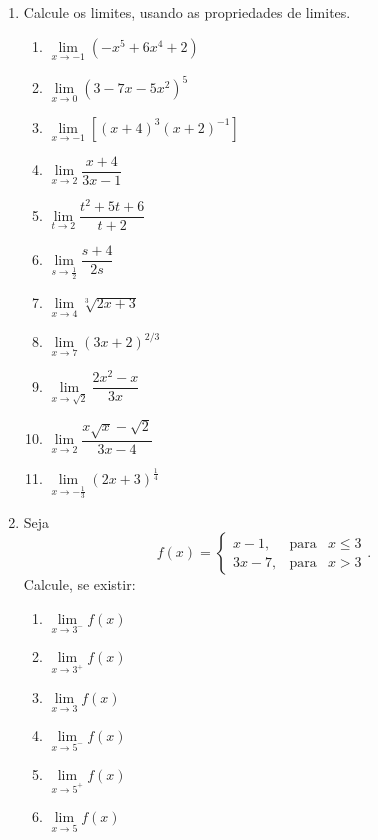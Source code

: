 

\begin{enumerate}

\item Calcule os limites, usando as propriedades de limites.
\begin{multicols}{3}
\begin{enumerate}
\item $\lim\limits_{x\to -1} (-x^5 + 6x^4 + 2)$
\item $ \lim\limits_{x\to 0} \left(3 -7x -5x^2\right)^5$

\item $ \lim\limits_{x\to -1} \left[(x + 4)^3(x +
2)^{-1}\right]$ 

\item $ \lim\limits_{x\to 2} \dfrac{x + 4}{ 3x- 1}$
 
\item $ \lim\limits_{t\to 2} \dfrac{t^2 + 5t + 6}{ t + 2} $ 

\item $\lim\limits_{s\to \frac{1}{ 2}} \dfrac{s + 4}{ 2s} $

\item $\lim\limits_{x\to 4}\displaystyle\sqrt[3]{2x +3}$

\item $\lim\limits_{x\to 7} \left(3x + 2\right)^{2/3}$

\item $\lim\limits_{x\to \sqrt{ 2}}\dfrac{2x^2 - x} {3x}$ 

\item $\lim\limits_{x\to 2} \dfrac{x\sqrt{x} - \sqrt{2}}{ 3x - 4}$

\item $\lim\limits_{x\to -\frac{1}{ 3}} (2x + 3)^{\frac{1}{4}}$
\end{enumerate}
\end{multicols}




\item Seja $$f(x) = \left\{\begin{array}{rcl} x - 1,& \mbox{para}&
x \leq 3\\
 3x-7,& \mbox{para}& x
> 3 \end{array}
\right..$$ Calcule, se existir:
    \begin{multicols}{2}
    \begin{enumerate}
    \item $\lim\limits_{x\to 3^-}f(x)$
    \item $\lim\limits_{x\to 3^+} f(x)$ 
    \item $\lim\limits_{x\to 3} f(x) $ 
    \item $\lim\limits_{x \to 5^-} f(x)$ 
    \item $\lim \limits_{x\to 5^+} f(x)$
    \item $\lim\limits_{x\to 5} f(x)$
    \end{enumerate}
    \end{multicols}


\end{enumerate}
